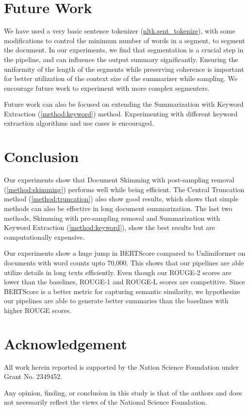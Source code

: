 \section{Future Work}
	\label{sec:future-work}

	We have used a very basic sentence tokenizer
	(\href{https://www.nltk.org/api/nltk.tokenize.sent_tokenize.html}{nltk.sent\_tokenize}),
	with some modifications to control the minimum number of words in a segment,
	to segment the document.
	In our experiments, we find that segmentation is a crucial step in the pipeline, and can
	influence the output summary significantly.
	Ensuring the uniformity of the length of the segments while preserving coherence is
	important for better utilization of the context size of the summarizer while sampling.
	We encourage future work to experiment with more complex segmenters.

	Future work can also be focused on extending the Summarization with Keyword Extraction
	(\ref{method:keyword}) method.
	Experimenting with different keyword extraction algorithms and use cases is encouraged.


\section{Conclusion}
\label{sec:conclusion}

	Our experiments show that Document Skimming with post-sampling removal
	(\ref{method:skimming}) performs well while being efficient.
	The Central Truncation method (\ref{method:truncation}) also show good results,
	which shows that simple methods can also be effective in long document summarization.
	The last two methods, Skimming with pre-sampling removal and Summarization with Keyword
	Extraction (\ref{method:keyword}), show the best results but are computationally expensive.

	Our experiments show a huge jump in BERTScore compared to Unlimiformer on documents
	with word counts upto 70,000.
	This shows that our pipelines are able utilize details in long texts efficiently.
	Even though our ROUGE-2 scores are lower than the baselines, ROUGE-1 and ROUGE-L
	scores are competitive.
	Since BERTScore is a better metric for capturing semantic similarity, we hypothesize
	our pipelines are able to generate better summaries than the baselines with higher
	ROUGE scores.


\section*{Acknowledgement}

	All work herein reported is supported by the Nation Science Foundation under Grant
	No. 2349452.

	Any opinion, finding, or conclusion in this study is that of the authors and does not
	necessarily reflect the views of the National Science Foundation.
